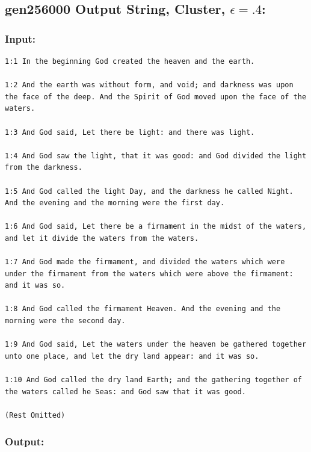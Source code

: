 \documentclass[11pt]{article}
\begin{document}
\pagebreak

\subsection*{gen256000 Output String, Cluster, $\epsilon=.4$:}

\subsubsection*{Input:}

\begin{lstlisting}
1:1 In the beginning God created the heaven and the earth.

1:2 And the earth was without form, and void; and darkness was upon
the face of the deep. And the Spirit of God moved upon the face of the
waters.

1:3 And God said, Let there be light: and there was light.

1:4 And God saw the light, that it was good: and God divided the light
from the darkness.

1:5 And God called the light Day, and the darkness he called Night.
And the evening and the morning were the first day.

1:6 And God said, Let there be a firmament in the midst of the waters,
and let it divide the waters from the waters.

1:7 And God made the firmament, and divided the waters which were
under the firmament from the waters which were above the firmament:
and it was so.

1:8 And God called the firmament Heaven. And the evening and the
morning were the second day.

1:9 And God said, Let the waters under the heaven be gathered together
unto one place, and let the dry land appear: and it was so.

1:10 And God called the dry land Earth; and the gathering together of
the waters called he Seas: and God saw that it was good.

(Rest Omitted)

\end{lstlisting}

\subsubsection*{Output:}
\end{document}
